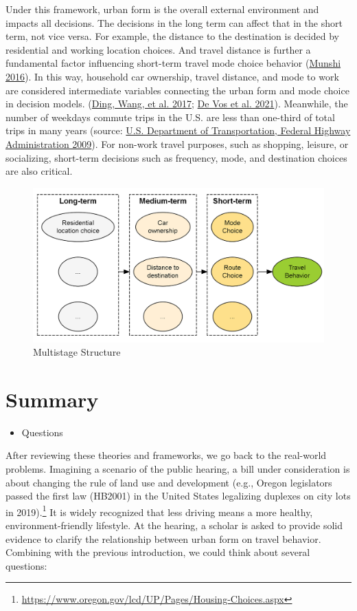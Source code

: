 \documentclass[
  12pt,
]{article}
\providecommand{\tightlist}{%
  \setlength{\itemsep}{0pt}\setlength{\parskip}{0pt}}
\begin{document}
Under this framework, urban form is the overall external environment and impacts all decisions. The decisions in the long term can affect that in the short term, not vice versa. For example, the distance to the destination is decided by residential and working location choices. And travel distance is further a fundamental factor influencing short-term travel mode choice behavior (\protect\hyperlink{ref-munshiBuiltEnvironmentMode2016}{Munshi 2016}). In this way, household car ownership, travel distance, and mode to work are considered intermediate variables connecting the urban form and mode choice in decision models. (\protect\hyperlink{ref-dingExploringInfluenceBuilt2017}{Ding, Wang, et al. 2017}; \protect\hyperlink{ref-devosIndirectEffectBuilt2021}{De Vos et al. 2021}). Meanwhile, the number of weekdays commute trips in the U.S. are less than one-third of total trips in many years (source: \protect\hyperlink{ref-nhts_2009}{U.S. Department of Transportation, Federal Highway Administration 2009}). For non-work travel purposes, such as shopping, leisure, or socializing, short-term decisions such as frequency, mode, and destination choices are also critical.

\begin{figure}

{\centering \includegraphics[width=0.5\linewidth]{fig/mstage} 

}

\caption{Multistage Structure}\label{fig:Mstage}
\end{figure}

\hypertarget{summary}{%
\section{Summary}\label{summary}}

\begin{itemize}
\tightlist
\item
  Questions
\end{itemize}

After reviewing these theories and frameworks, we go back to the real-world problems. Imagining a scenario of the public hearing, a bill under consideration is about changing the rule of land use and development (e.g., Oregon legislators passed the first law (HB2001) in the United States legalizing duplexes on city lots in 2019).\footnote{\url{https://www.oregon.gov/lcd/UP/Pages/Housing-Choices.aspx}} It is widely recognized that less driving means a more healthy, environment-friendly lifestyle. At the hearing, a scholar is asked to provide solid evidence to clarify the relationship between urban form on travel behavior. Combining with the previous introduction, we could think about several questions:
\end{document}
